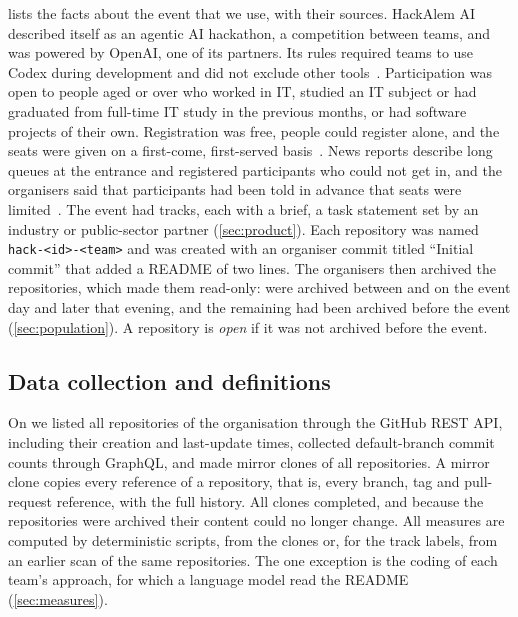 \documentclass{article}
\begin{document}
 lists the facts about the event that we use, with their sources. HackAlem AI described itself as an agentic AI hackathon, a competition between teams, and was powered by OpenAI, one of its partners. Its rules required teams to use Codex during development and did not exclude other tools~\cite{hackalem2026site}. Participation was open to people aged \agemin{} or over who worked in IT, studied an IT subject or had graduated from full-time IT study in the previous \gradmonths{} months, or had software projects of their own. Registration was free, people could register alone, and the \seats{} seats were given on a first-come, first-served basis~\cite{hackalem2026site}. News reports describe long queues at the entrance and registered participants who could not get in, and the organisers said that participants had been told in advance that seats were limited~\cite{qumash2026queue,ulys2026survival}. The event had \NTracksCount{} tracks, each with a brief, a task statement set by an industry or public-sector partner (\cref{sec:product}). Each repository was named \texttt{hack-<id>-<team>} and was created with an organiser commit titled ``Initial commit'' that added a README of two lines. The organisers then archived the repositories, which made them read-only: \NValidationArchiveWaveN{} were archived between \NValidationArchiveWaveFirst{} and \NValidationArchiveWaveLast{} on the event day and \NValidationArchiveLaterN{} later that evening, and the remaining \NRqOnePrearchivedN{} had been archived before the event (\cref{sec:population}). A repository is \emph{open} if it was not archived before the event.

\subsection{Data collection and definitions}\label{sec:data}
On \datacollected{} we listed all repositories of the organisation through the GitHub REST API, including their creation and last-update times, collected default-branch commit counts through GraphQL, and made mirror clones of all \NRqOneTotal{} repositories. A mirror clone copies every reference of a repository, that is, every branch, tag and pull-request reference, with the full history. All clones completed, and because the repositories were archived their content could no longer change. All measures are computed by deterministic scripts, from the clones or, for the track labels, from an earlier scan of the same repositories. The one exception is the coding of each team's approach, for which a language model read the README (\cref{sec:measures}).
\end{document}

